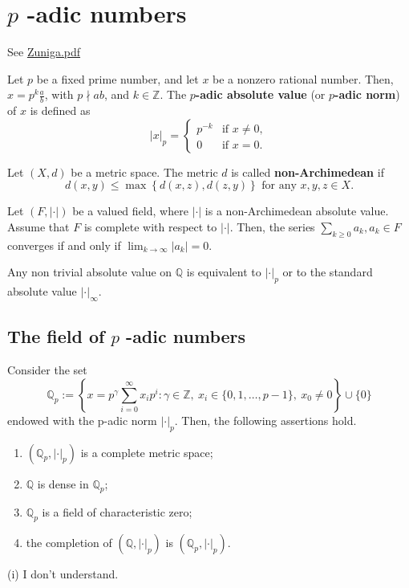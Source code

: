 \section{\texorpdfstring{$p$}{p} -adic numbers}

See \href{https://w3.math.cinvestav.mx/p-adic2019/sites/default/files/Zuniga.pdf}{Zuniga.pdf}

\begin{definition}
Let $p$ be a fixed prime number, and let $x$ be a nonzero rational number. Then, $x = p^k \frac{a}{b}$, with $p \nmid ab$, and $k \in \mathbb{Z}$. The \textbf{$p$-adic absolute value} (or \textbf{$p$-adic norm}) of $x$ is defined as
\[
|x|_p = \begin{cases} p^{-k} & \text{if } x \neq 0, \\ 0 & \text{if } x = 0. \end{cases}
\]
\end{definition}
\begin{definition}
Let $(X,d)$ be a metric space. The metric $d$ is called \textbf{non-Archimedean} if
\[
d(x,y) \leq \max\left\{d\left(x,z\right),d\left(z,y\right)\right\} \text{ for any } x,y,z \in X.
\]
\end{definition}
\begin{exercise}
Let $\left(F,|\cdot|\right)$ be a valued field, where $|\cdot|$ is a non-Archimedean absolute value. Assume that $F$ is complete with respect to $|\cdot|$. Then, the series $\sum_{k \geq 0} a_k, a_k \in F$ converges if and only if $\lim_{k \to \infty} |a_k| = 0$.
\end{exercise}
\begin{theorem}[Ostrowski]
Any non trivial absolute value on $\mathbb{Q}$ is equivalent to $|\cdot|_p$ or to the standard absolute value $|\cdot|_\infty$.
\end{theorem}
\subsection{The field of \texorpdfstring{$p$}{p} -adic numbers}

\begin{lemma}
Consider the set
\[
\mathbb{Q}_p := \left\{ x = p^\gamma \sum_{i=0}^\infty x_i p^i : \gamma \in \mathbb{Z}, \ x_i \in \{0,1,\ldots,p-1\}, \ x_0 \neq 0 \right\} \cup \{0\}
\]
endowed with the p-adic norm $|\cdot|_p$. Then, the following assertions hold.
	\begin{enumerate}
		\item $(\mathbb{Q}_p, |\cdot|_p)$ is a complete metric space;
		\item $\mathbb{Q}$ is dense in $\mathbb{Q}_p$;
		\item $\mathbb{Q}_p$ is a field of characteristic zero;
		\item the completion of $(\mathbb{Q}, |\cdot|_p)$ is $(\mathbb{Q}_p, |\cdot|_p)$.
	\end{enumerate}
\end{lemma}
(i)
I don't understand.

